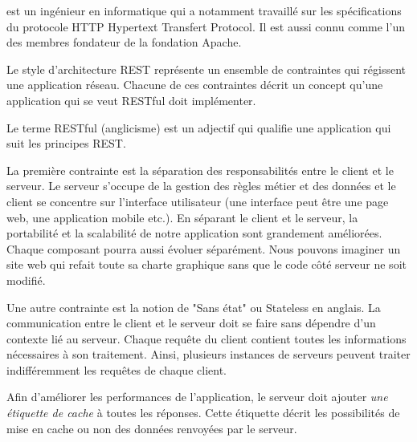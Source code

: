 \documentclass[big]{zmdocument}
\begin{document}
 est un ingénieur en informatique qui a notamment travaillé sur les spécifications du protocole HTTP Hypertext Transfert Protocol. Il est aussi connu comme l'un des membres fondateur de la fondation Apache.







Le style d'architecture REST représente un ensemble de contraintes qui régissent une application réseau. Chacune de ces contraintes décrit un concept qu'une application qui se veut RESTful doit implémenter.



\begin{Information}
Le terme RESTful (anglicisme) est un adjectif qui qualifie une application qui suit les principes REST.
\end{Information}




La première contrainte est la séparation des responsabilités entre le client et le serveur. Le serveur s'occupe de la gestion des règles métier et des données et le client se concentre sur l'interface utilisateur (une interface peut être une page web, une application mobile etc.).
En séparant le client et le serveur, la portabilité et la scalabilité de notre application sont grandement améliorées. Chaque composant pourra aussi évoluer séparément.
Nous pouvons imaginer un site web qui refait toute sa charte graphique sans que le code côté serveur ne soit modifié.





Une autre contrainte est la notion de "Sans état" ou Stateless en anglais.
La communication entre le client et le serveur doit se faire sans dépendre d'un contexte lié au serveur. Chaque requête du client contient toutes les informations nécessaires à son traitement.
Ainsi, plusieurs instances de serveurs peuvent traiter indifféremment les requêtes de chaque client.





Afin d'améliorer les performances de l'application, le serveur doit ajouter \textit{une étiquette de cache} à toutes les réponses.
Cette étiquette décrit les possibilités de mise en cache ou non des données renvoyées par le serveur.
\end{document}
